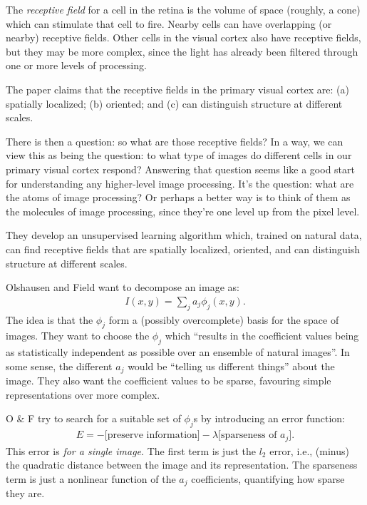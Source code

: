 \documentclass[12pt]{report}
\begin{document}
The \emph{receptive field} for a cell in the retina is the volume of
space (roughly, a cone) which can stimulate that cell to fire.  Nearby
cells can have overlapping (or nearby) receptive fields.  Other cells
in the visual cortex also have receptive fields, but they may be more
complex, since the light has already been filtered through one or more
levels of processing.  

The paper claims that the receptive fields in the primary visual
cortex are: (a) spatially localized; (b) oriented; and (c) can
distinguish structure at different scales.

There is then a question: so what are those receptive fields?  In a
way, we can view this as being the question: to what type of images do
different cells in our primary visual cortex respond?  Answering that
question seems like a good start for understanding any higher-level
image processing.  It's the question: what are the atoms of image
processing?  Or perhaps a better way is to think of them as the
molecules of image processing, since they're one level up from the
pixel level.

They develop an unsupervised learning algorithm which, trained on
natural data, can find receptive fields that are spatially localized,
oriented, and can distinguish structure at different scales.

Olshausen and Field want to decompose an image as:
\begin{eqnarray}
  I(x,y) = \sum_j a_j \phi_j(x,y).
\end{eqnarray}
The idea is that the $\phi_j$ form a (possibly overcomplete) basis for
the space of images.  They want to choose the $\phi_j$ which ``results
in the coefficient values being as statistically independent as
possible over an ensemble of natural images''.  In some sense, the
different $a_j$ would be ``telling us different things'' about the
image.  They also want the coefficient values to be sparse, favouring
simple representations over more complex.

O \& F try to search for a suitable set of $\phi_j$s by introducing an
error function:
\begin{eqnarray}
  E = -\mbox{[preserve information]}-\lambda\mbox{[sparseness of } a_j {]}.
\end{eqnarray}
This error is \emph{for a single image}.  The first term is just the
$l_2$ error, i.e., (minus) the quadratic distance between the image
and its representation.  The sparseness term is just a nonlinear
function of the $a_j$ coefficients, quantifying how sparse they are.
\end{document}
